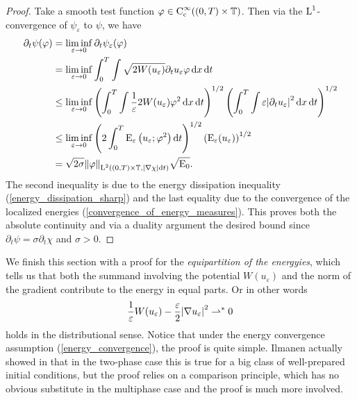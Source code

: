 \begin{proof}
	Take a smooth test function $ \varphi \in \operatorname{C}_{ \mathrm{ c } }^{ \infty } 
	( ( 0 , T ) \times \operatorname{\mathbb{T}} )$. 
	Then via the $ \operatorname{L}^{ 1 } $-convergence of $ \psi_{ \varepsilon } $ to $ 
	\psi 
	$, we have
	\begin{align*}
		\partial_{ t } \psi ( \varphi )
		& =
		\liminf_{ \varepsilon \to 0 }
		\partial_{ t } \psi_{ \varepsilon } ( \varphi )
		\\
		& =
		\liminf_{ \varepsilon \to 0 }
		\int_{ 0 }^{ T }
		\int
		\sqrt{ 2 W ( u_{ \varepsilon } ) }
		\partial_{ t } u_{ \varepsilon }
		\varphi
		\dd{ x }
		\dd{ t }
		\\
		& \leq
		\liminf_{ \varepsilon \to 0 }
		\left( 
		\int_{ 0 }^{ T }
		\int
		\frac{ 1 }{ \varepsilon } 2 W ( u_{ \varepsilon } )
		\varphi^{ 2 }
		\dd{ x }
		\dd{ t }
		\right)^{ 1/ 2 }
		\left(
		\int_{ 0 }^{ T }
		\int
		\varepsilon
		\abs{ \partial_{ t } u_{ \varepsilon } }^{ 2 }
		\dd{ x }
		\dd{ t }
		\right)^{ 1/2 }
		\\
		& \leq
		\liminf_{ \varepsilon \to 0 }
		\left(
		2 
		\int_{ 0 }^{ T }
		\operatorname{E}_{ \varepsilon} \left( u_{ \varepsilon } ; \varphi^{ 2 } \right)
		\dd{ t }
		\right)^{ 1/ 2 }
		\left(
		\operatorname{E}_{ \varepsilon } ( u_{ \varepsilon } )
		\right)^{ 1/2 }
		\\
		& =
		\sqrt{ 2 \sigma }
		\norm{ \varphi }_{ \operatorname{L}^{ 2 } ( ( 0 , T ) \times \operatorname{\mathbb{T}} , \abs{ 
		\nabla \chi } \dd{ t 
		} ) }
		\sqrt{ \operatorname{E}_{ 0 } }.
	\end{align*}
	The second inequality is due to the energy dissipation inequality 
	(\ref{energy_dissipation_sharp}) and the last equality due to the 
	convergence of the localized energies 
	(\ref{convergence_of_energy_measures}).
	This proves both the absolute continuity and via a duality argument the 
	desired bound since $ \partial_{ t } \psi = \sigma \partial_{ t } \chi $ 
	and $ \sigma > 0 $.
\end{proof}

We finish this section with a proof for the \emph{equipartition of the 
energyies}, which 
tells us that both the summand involving the potential $ W ( u_{ \varepsilon } 
) $ and the norm of the gradient contribute to the energy in equal parts. Or in 
other words
\begin{equation*}
	\frac{ 1 }{ \varepsilon } W ( u_{ \varepsilon } ) 
	- 
	\frac{ \varepsilon }{ 2 }
	\abs{ \nabla u_{ \varepsilon } }^{ 2 }
	\rightharpoonup^{ \ast }
	0 
\end{equation*}
holds in the distributional sense. Notice that under the 
energy convergence assumption (\ref{energy_convergence}), the proof is quite 
simple. Ilmanen actually showed in 
\cite{ilmanen_convergence_of_ac_to_brakkes_mcf} that in the two-phase case this 
is true
for a big class of well-prepared initial conditions, but the proof relies on a 
comparison principle, which has no obvious substitute in the multiphase case 
and the proof is much more involved.

